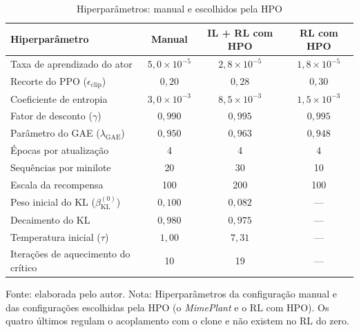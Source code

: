 \begin{table}[htbp]
\centering
\small\setlength{\tabcolsep}{3pt}
\caption{Hiperparâmetros: manual e escolhidos pela HPO}
\label{tab:hp_escolhidos}
\begin{tabular}{l c c c}
\hline
\textbf{Hiperparâmetro} & \textbf{Manual} & \textbf{IL + RL com HPO} & \textbf{RL com HPO} \\ \hline
Taxa de aprendizado do ator & $5{,}0 \times 10^{-5}$ & $2{,}8 \times 10^{-5}$ & $1{,}8 \times 10^{-5}$ \\
Recorte do PPO ($\epsilon_{\text{clip}}$) & $0{,}20$ & $0{,}28$ & $0{,}30$ \\
Coeficiente de entropia & $3{,}0 \times 10^{-3}$ & $8{,}5 \times 10^{-3}$ & $1{,}5 \times 10^{-3}$ \\
Fator de desconto ($\gamma$) & $0{,}990$ & $0{,}995$ & $0{,}995$ \\
Parâmetro do GAE ($\lambda_{\text{GAE}}$) & $0{,}950$ & $0{,}963$ & $0{,}948$ \\
Épocas por atualização & 4 & 4 & 4 \\
Sequências por minilote & 20 & 30 & 10 \\
Escala da recompensa & 100 & 200 & 100 \\ \hline
Peso inicial do KL ($\beta_{\text{KL}}^{(0)}$) & $0{,}100$ & $0{,}082$ & --- \\
Decaimento do KL & $0{,}980$ & $0{,}975$ & --- \\
Temperatura inicial ($\tau$) & $1{,}00$ & $7{,}31$ & --- \\
Iterações de aquecimento do crítico & 10 & 19 & --- \\
\hline
\end{tabular}

{\footnotesize Fonte: elaborada pelo autor. Nota: Hiperparâmetros da configuração manual e das configurações escolhidas pela HPO (o \textit{MimePlant} e o RL com HPO). Os quatro últimos regulam o acoplamento com o clone e não existem no RL do zero.}
\end{table}
